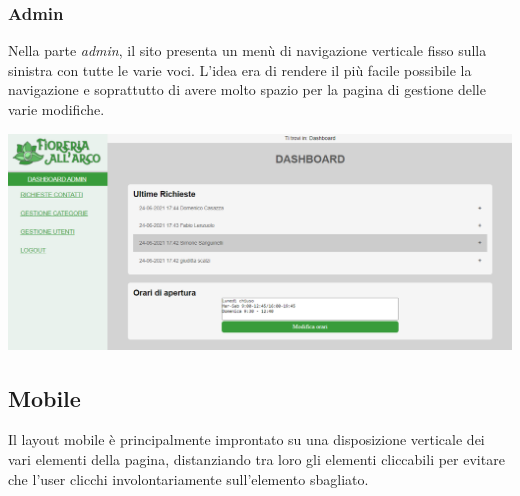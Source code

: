\subsubsection{Admin}
Nella parte \textit{admin}, il sito presenta un menù di navigazione verticale fisso sulla sinistra con tutte le varie voci. L'idea era di rendere il più facile possibile la navigazione e soprattutto di avere molto spazio per la pagina di gestione delle varie modifiche.
\begin{center}
\includegraphics[scale = 0.4]{../latex/images/desktopadmin.png}\\[0.5cm]
\end{center}
\subsection{Mobile}
Il layout mobile è principalmente improntato su una disposizione verticale dei vari elementi della pagina, distanziando tra loro gli elementi cliccabili per evitare che l'user clicchi involontariamente sull'elemento sbagliato. 
